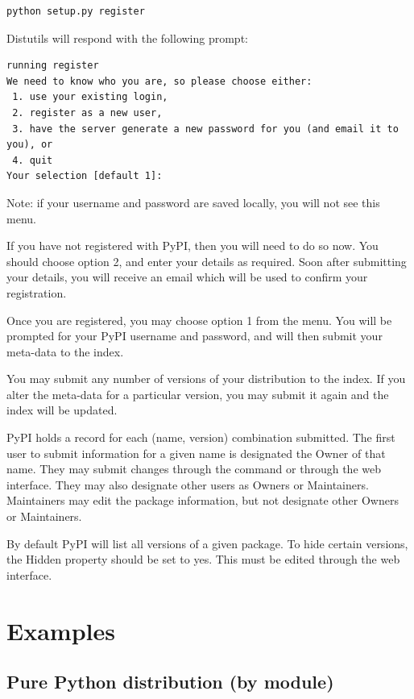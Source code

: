 \documentclass{howto}
\begin{document}
\begin{verbatim}
python setup.py register
\end{verbatim}

Distutils will respond with the following prompt:

\begin{verbatim}
running register
We need to know who you are, so please choose either:
 1. use your existing login,
 2. register as a new user,
 3. have the server generate a new password for you (and email it to you), or
 4. quit
Your selection [default 1]:
\end{verbatim}

\noindent Note: if your username and password are saved locally, you will
not see this menu.

If you have not registered with PyPI, then you will need to do so now. You
should choose option 2, and enter your details as required. Soon after
submitting your details, you will receive an email which will be used to
confirm your registration.

Once you are registered, you may choose option 1 from the menu. You will
be prompted for your PyPI username and password, and 
will then submit your meta-data to the index.

You may submit any number of versions of your distribution to the index. If
you alter the meta-data for a particular version, you may submit it again
and the index will be updated.

PyPI holds a record for each (name, version) combination submitted. The
first user to submit information for a given name is designated the Owner
of that name. They may submit changes through the 
command or through the web interface. They may also designate other users
as Owners or Maintainers. Maintainers may edit the package information, but
not designate other Owners or Maintainers.

By default PyPI will list all versions of a given package. To hide certain
versions, the Hidden property should be set to yes. This must be edited
through the web interface.



\section{Examples}
\label{examples}
  
\subsection{Pure Python distribution (by module)}
\label{pure-mod}
\end{document}

